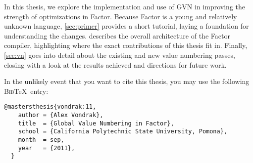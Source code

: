 In this thesis, we explore the implementation and use of \gls{GVN} in improving
the strength of optimizations in Factor.  Because Factor is a young and
relatively unknown language, \cref{sec:primer} provides a short tutorial,
laying a foundation for understanding the changes.  
describes the overall architecture of the Factor compiler, highlighting where
the exact contributions of this thesis fit in.  Finally, \cref{sec:vn} goes
into detail about the existing and new value numbering passes, closing with a
look at the results achieved and directions for future work. 

In the unlikely event that you want to cite this thesis, you may use the
following \textsc{Bib}\TeX~entry:
\begin{Verbatim}[gobble=2,frame=single]
  @mastersthesis{vondrak:11,
    author = {Alex Vondrak},
    title  = {Global Value Numbering in Factor},
    school = {California Polytechnic State University, Pomona},
    month  = sep,
    year   = {2011},
  }
\end{Verbatim}

